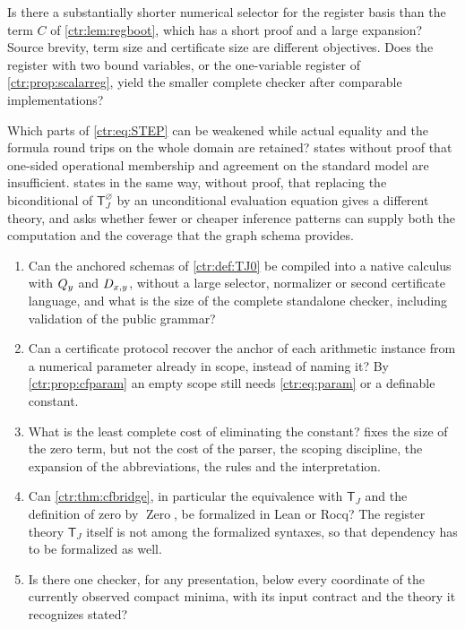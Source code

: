 \begin{question}
Is there a substantially shorter numerical selector for the register basis than the term
$C$ of \cref{ctr:lem:regboot}, which has a short proof and a large expansion? Source
brevity, term size and certificate size are different objectives. Does the register with
two bound variables, or the one-variable register of \cref{ctr:prop:scalarreg}, yield the
smaller complete checker after comparable implementations?
\end{question}

\begin{question}
Which parts of \eqref{ctr:eq:STEP} can be weakened while actual equality and the formula
round trips on the whole domain are retained?  states without proof
that one-sided operational membership and agreement on the standard model are insufficient.
 states in the same way, without proof, that replacing the biconditional
of $\mathsf T_J^{\varnothing}$ by an unconditional evaluation equation gives a different
theory, and asks whether fewer or cheaper inference patterns can supply both the
computation and the coverage that the graph schema provides.
\end{question}

\begin{question}
\begin{enumerate}
\item Can the anchored schemas of \cref{ctr:def:TJ0} be compiled into a native calculus with
$Q_{y}$ and $D_{x,y}$, without a large selector, normalizer or second certificate
language, and what is the size of the complete standalone checker, including validation of
the public grammar?
\item Can a certificate protocol recover the anchor of each arithmetic instance from a
numerical parameter already in scope, instead of naming it? By
\cref{ctr:prop:cfparam} an empty scope still needs \eqref{ctr:eq:param} or a definable
constant.
\item What is the least complete cost of eliminating the constant? 
fixes the size of the zero term, but not the cost of the parser, the scoping discipline, the
expansion of the abbreviations, the rules and the interpretation.
\item Can \cref{ctr:thm:cfbridge}, in particular the equivalence with $\mathsf T_J$ and the
definition of zero by $\operatorname{Zero}$, be formalized in Lean or Rocq? The register
theory $\mathsf T_J$ itself is not among the formalized syntaxes, so that dependency has to
be formalized as well.
\item Is there one checker, for any presentation, below every coordinate of the currently
observed compact minima, with its input contract and the theory it recognizes stated?
\end{enumerate}
\end{question}

